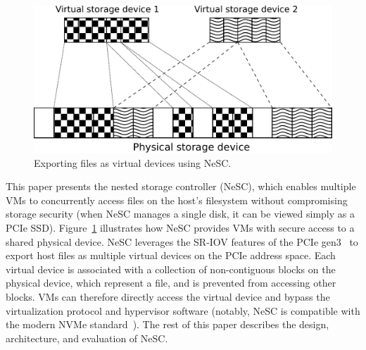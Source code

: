 \begin{figure}[t]
  \centering
  \includegraphics[width=\columnwidth]{figs/nesc-overview.pdf}
  \caption{Exporting files as virtual devices using NeSC.\label{fig:nesc_outline}}  
\end{figure}

This paper presents the nested storage controller (NeSC), which enables multiple VMs to concurrently access files on the host's filesystem without compromising storage security (when NeSC manages a single disk, it can be viewed simply as a PCIe SSD).
Figure~\ref{fig:nesc_outline} illustrates how NeSC provides VMs with secure access to a shared physical device.
NeSC leverages the SR-IOV features of the PCIe gen3~\cite{pcisigiov} to export host files as multiple virtual devices on the PCIe address space. Each virtual device is associated with a collection of non-contiguous blocks on the physical device, which represent a file, and is  prevented from accessing other blocks. VMs can therefore directly access the virtual device and bypass the virtualization protocol and hypervisor software (notably, NeSC is compatible with the modern NVMe standard~\cite{nvme}).
The rest of this paper describes the design, architecture, and evaluation of NeSC.




